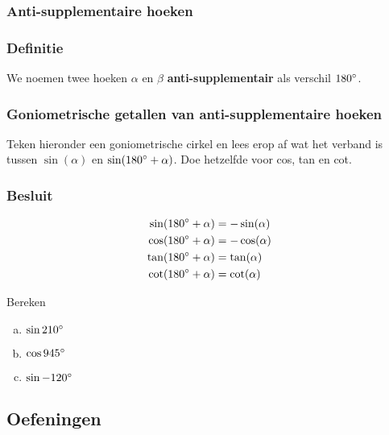 \documentclass[a4paper,12pt]{article}
\begin{document}
\begin{theorie}

\pagebreak
\subsubsection{Anti-supplementaire hoeken}

\subsubsection*{Definitie}
We noemen twee hoeken $\alpha$ en $\beta$ \textbf{anti-supplementair} als verschil $180^\circ$.

\subsubsection*{Goniometrische getallen van anti-supplementaire hoeken}
Teken hieronder een goniometrische cirkel en lees erop af wat het verband is tussen $\sin(\alpha)$ en $\sin(180^\circ+\alpha)$. Doe hetzelfde voor cos, tan en cot.
\vspace*{6cm}

\subsubsection*{Besluit}
\begin{align*}
\sin(180^\circ+\alpha)&=-\sin(\alpha)\\
\cos(180^\circ+\alpha)&=-\cos(\alpha)\\
\tan(180^\circ+\alpha)&=\tan(\alpha)\\
\cot(180^\circ+\alpha)&=\cot(\alpha)
\end{align*}

\end{theorie}

\begin{oefening}
Bereken
\begin{multicols}{3}
\begin{enumerate}[(a)]
  \item $\sin210^\circ$
  \item $\cos945^\circ$
  \item $\sin-120^\circ$
\end{enumerate}
\end{multicols}
\end{oefening}

\begin{theorie}

\pagebreak
\subsection{Oefeningen}

\end{theorie}
\end{document}

